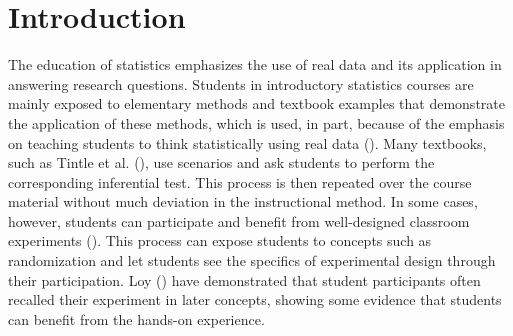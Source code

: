 \documentclass[
  12pt,
]{article}
\begin{document}
\section{Introduction}\label{introduction}

The education of statistics emphasizes the use of real data and its
application in answering research questions. Students in introductory
statistics courses are mainly exposed to elementary methods and textbook
examples that demonstrate the application of these methods, which is
used, in part, because of the emphasis on teaching students to think
statistically using real data (). Many textbooks, such as Tintle et al.
(), use scenarios and ask students to
perform the corresponding inferential test. This process is then
repeated over the course material without much deviation in the
instructional method. In some cases, however, students can participate
and benefit from well-designed classroom experiments
(). This process can expose
students to concepts such as randomization and let students see the
specifics of experimental design through their participation. Loy
() have demonstrated that student
participants often recalled their experiment in later concepts, showing
some evidence that students can benefit from the hands-on experience.
\end{document}
